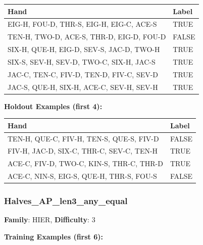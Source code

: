 \documentclass[10pt,a4paper]{article}
\begin{document}
\begin{small}
\begin{tabular}{p{8cm}l}
\toprule
Hand & Label \\
\midrule
EIG-H, FOU-D, THR-S, EIG-H, EIG-C, ACE-S & \textcolor{positive}{TRUE} \\
TEN-H, TWO-D, ACE-S, THR-D, EIG-D, FOU-D & \textcolor{negative}{FALSE} \\
SIX-H, QUE-H, EIG-D, SEV-S, JAC-D, TWO-H & \textcolor{positive}{TRUE} \\
SIX-S, SEV-H, SEV-D, TWO-C, SIX-H, JAC-S & \textcolor{positive}{TRUE} \\
JAC-C, TEN-C, FIV-D, TEN-D, FIV-C, SEV-D & \textcolor{positive}{TRUE} \\
JAC-S, QUE-H, SIX-H, ACE-C, SEV-H, SEV-H & \textcolor{positive}{TRUE} \\
\bottomrule
\end{tabular}
\end{small}

\textbf{Holdout Examples (first 4):}

\begin{small}
\begin{tabular}{p{8cm}l}
\toprule
Hand & Label \\
\midrule
TEN-H, QUE-C, FIV-H, TEN-S, QUE-S, FIV-D & \textcolor{negative}{FALSE} \\
FIV-H, JAC-D, SIX-C, THR-C, SEV-C, TEN-H & \textcolor{positive}{TRUE} \\
ACE-C, FIV-D, TWO-C, KIN-S, THR-C, THR-D & \textcolor{positive}{TRUE} \\
ACE-C, NIN-S, EIG-S, QUE-H, THR-S, FOU-S & \textcolor{negative}{FALSE} \\
\bottomrule
\end{tabular}
\end{small}

\vspace{0.5cm}

\subsubsection{Halves\_AP\_len3\_any\_equal}

\textbf{Family}: HIER, \textbf{Difficulty}: 3

\textbf{Training Examples (first 6):}
\end{document}
